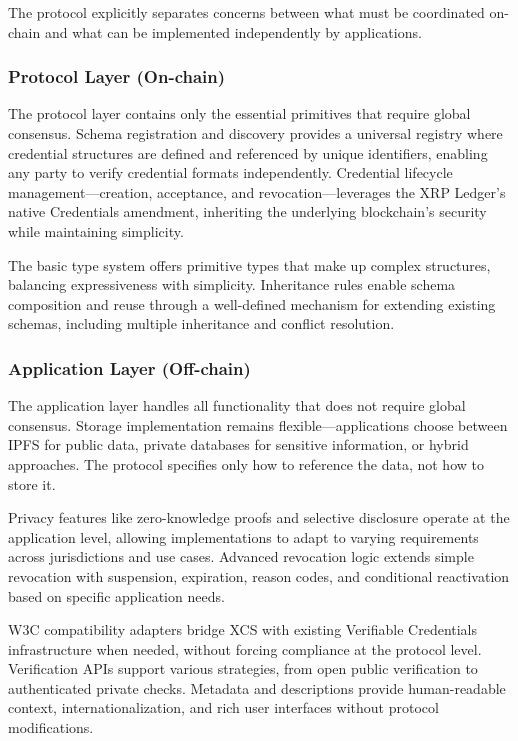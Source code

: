 \documentclass[11pt,a4paper]{article}
\begin{document}
The protocol explicitly separates concerns between what must be coordinated on-chain and what can be implemented independently by applications.

\subsubsection{Protocol Layer (On-chain)}

The protocol layer contains only the essential primitives that require global consensus. Schema registration and discovery provides a universal registry where credential structures are defined and referenced by unique identifiers, enabling any party to verify credential formats independently. Credential lifecycle management—creation, acceptance, and revocation—leverages the XRP Ledger's native Credentials amendment, inheriting the underlying blockchain's security while maintaining simplicity.

The basic type system offers primitive types that make up complex structures, balancing expressiveness with simplicity. Inheritance rules enable schema composition and reuse through a well-defined mechanism for extending existing schemas, including multiple inheritance and conflict resolution.

\subsubsection{Application Layer (Off-chain)}

The application layer handles all functionality that does not require global consensus. Storage implementation remains flexible—applications choose between IPFS for public data, private databases for sensitive information, or hybrid approaches. The protocol specifies only how to reference the data, not how to store it.

Privacy features like zero-knowledge proofs and selective disclosure operate at the application level, allowing implementations to adapt to varying requirements across jurisdictions and use cases. Advanced revocation logic extends simple revocation with suspension, expiration, reason codes, and conditional reactivation based on specific application needs.

W3C compatibility adapters bridge XCS with existing Verifiable Credentials infrastructure when needed, without forcing compliance at the protocol level. Verification APIs support various strategies, from open public verification to authenticated private checks. Metadata and descriptions provide human-readable context, internationalization, and rich user interfaces without protocol modifications.
\end{document}
